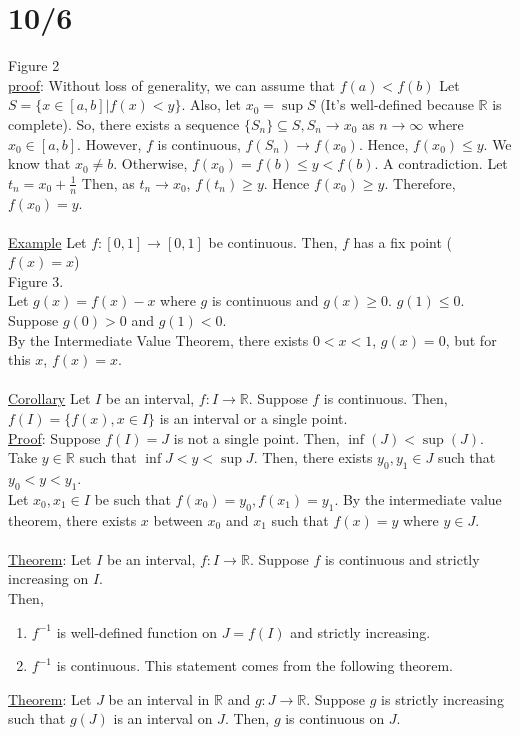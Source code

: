 \documentclass[11pt]{article}
\begin{document}
\section*{10/6}
	Figure 2\\
	\underline{proof}: Without loss of generality, we can assume that $f(a) < 
	f(b)$ Let $S = \{ x \in [a, b] | f(x) < y \}$. Also, let $x_0 = \sup S$
	(It's well-defined because $\mathbb{R}$ is complete). So, there exists a
	sequence $\{S_n\} \subseteq S, S_n \to x_0$ as $ n \to \infty$ where
	$x_0 \in [ a, b]$. However, $f$ is continuous, $f(S_n) \to f(x_0)$.
	Hence, $f(x_0) \le y$. We know that $x_0 \not= b$. Otherwise, $f(x_0) =
	f(b) \le y < f(b)$. A contradiction. Let $t_n = x_0 + \frac{1}{n}$ Then,
	as $t_n \to x_0$, $f(t_n) \ge y$. Hence $f(x_0) \ge y$. Therefore, $f(x_0)
	= y$.\\\\
	\underline{Example} Let $f: [0, 1] \to [0, 1]$ be continuous. Then, $f$ 
	has a fix point ($f(x) = x$)\\
	Figure 3.\\
	Let $g(x) = f(x) - x$ where $g$ is continuous and $g(x) \ge 0$. $g(1) \le 
	0$. Suppose $g(0) > 0$ and $g(1) < 0$.\\
	By the Intermediate Value Theorem, there exists $0 < x < 1$, $g(x) = 0$,
	but for this $x$, $f(x) = x$.\\\\
	\underline{Corollary} Let $I$ be an interval, $f: I \to \mathbb{R}$. 
	Suppose $f$ is continuous. Then, $f(I) = \{ f(x), x \in I \}$ is an 
	interval or a single point.\\
	\underline{Proof}: Suppose $f(I) = J$ is not a single point. Then,
	$\inf(J) < \sup(J)$. Take $y \in \mathbb{R}$ such that $\inf J < y < 
	\sup J$. Then, there exists $y_0, y_1 \in J$ such that $y_0 < y < y_1$.\\
	Let $x_0, x_1 \in I$ be such that $f(x_0) = y_0, f(x_1) = y_1.$ By the
	intermediate value theorem, there exists $x$ between $x_0$ and $x_1$ such
	that $f(x) = y$ where $y \in J$.\\\\
	\underline{Theorem}: Let $I$ be an interval, $f: I \to \mathbb{R}$. Suppose
	$f$ is continuous and strictly increasing on $I$.\\
	Then,
	\begin{enumerate}
		\item $f^{-1}$ is well-defined function on $J = f(I)$ and strictly 
		increasing. 
		\item $f^{-1}$ is continuous. This statement comes from the following 
		theorem.
	\end{enumerate}
	\underline{Theorem}: Let $J$ be an interval in $\mathbb{R}$ and $g : J \to
	\mathbb{R}$. Suppose $g$ is strictly increasing such that $g(J)$ is an
	interval on $J$. Then, $g$ is continuous on $J$.\\
\end{document}
